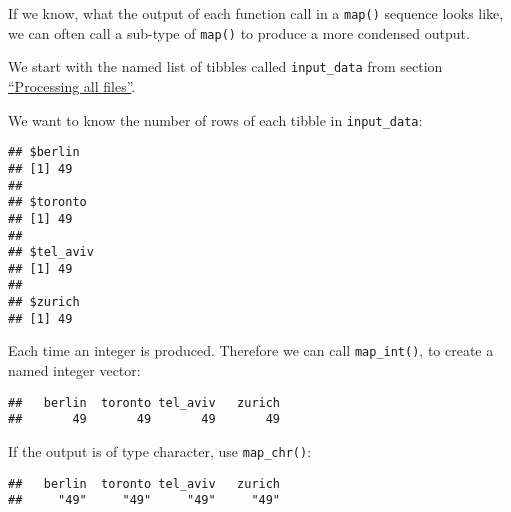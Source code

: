 \documentclass[]{book}
\newenvironment{Shaded}{\begin{snugshade}}{\end{snugshade}}
\newcommand{\KeywordTok}[1]{\textcolor[rgb]{0.13,0.29,0.53}{\textbf{#1}}}
\newcommand{\NormalTok}[1]{#1}
\newcommand{\OperatorTok}[1]{\textcolor[rgb]{0.81,0.36,0.00}{\textbf{#1}}}
\newcommand{\StringTok}[1]{\textcolor[rgb]{0.31,0.60,0.02}{#1}}
\begin{document}
If we know, what the output of each function call in a \texttt{map()} sequence looks like, we can often call a sub-type of \texttt{map()} to produce a more condensed output.

We start with the named list of tibbles called \texttt{input\_data} from section \protect\hyperlink{map}{``Processing all files''}.

We want to know the number of rows of each tibble in \texttt{input\_data}:

\begin{Shaded}
\end{Shaded}

\begin{verbatim}
## $berlin
## [1] 49
## 
## $toronto
## [1] 49
## 
## $tel_aviv
## [1] 49
## 
## $zurich
## [1] 49
\end{verbatim}

Each time an integer is produced.
Therefore we can call \texttt{map\_int()}, to create a named integer vector:

\begin{Shaded}
\end{Shaded}

\begin{verbatim}
##   berlin  toronto tel_aviv   zurich 
##       49       49       49       49
\end{verbatim}

If the output is of type character, use \texttt{map\_chr()}:

\begin{Shaded}
\end{Shaded}

\begin{verbatim}
##   berlin  toronto tel_aviv   zurich 
##     "49"     "49"     "49"     "49"
\end{verbatim}
\end{document}

